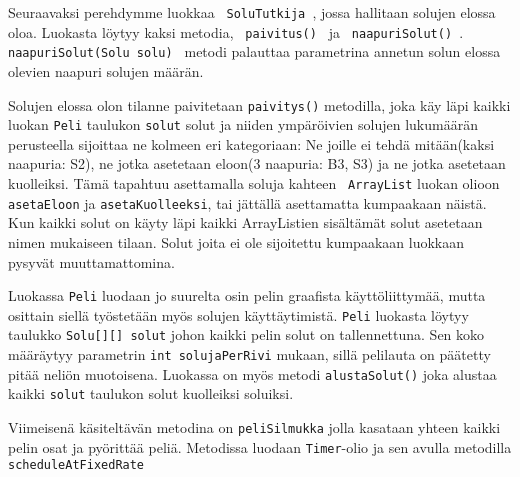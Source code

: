 Seuraavaksi perehdymme luokkaa \texttt{ SoluTutkija }, jossa hallitaan solujen elossa oloa. Luokasta löytyy kaksi metodia, \texttt{ paivitus() } ja \texttt{ naapuriSolut() }. \texttt{ naapuriSolut(Solu solu) } metodi palauttaa parametrina annetun solun elossa olevien naapuri solujen määrän. 

Solujen elossa olon tilanne paivitetaan \texttt{paivitys()} metodilla, joka käy läpi kaikki luokan \texttt{Peli} taulukon \texttt{solut} solut ja niiden ympäröivien solujen lukumäärän perusteella sijoittaa ne kolmeen eri kategoriaan: Ne joille ei tehdä mitään(kaksi naapuria: S2), ne jotka asetetaan eloon(3 naapuria: B3, S3) ja ne jotka asetetaan kuolleiksi. Tämä tapahtuu asettamalla soluja kahteen \texttt{ ArrayList} luokan olioon \texttt{asetaEloon} ja \texttt{asetaKuolleeksi}, tai jättällä asettamatta kumpaakaan näistä. Kun kaikki solut on käyty läpi kaikki ArrayListien sisältämät solut asetetaan nimen mukaiseen tilaan. Solut joita ei ole sijoitettu kumpaakaan luokkaan pysyvät muuttamattomina.

Luokassa \texttt{Peli} luodaan jo suurelta osin pelin graafista käyttöliittymää, mutta osittain siellä työstetään myös solujen käyttäytimistä. \texttt{Peli} luokasta löytyy taulukko \texttt{Solu[][] solut} johon kaikki pelin solut on tallennettuna. Sen koko määräytyy parametrin \texttt{int solujaPerRivi} mukaan, sillä pelilauta on päätetty pitää neliön muotoisena. Luokassa on myös metodi \texttt{alustaSolut()} joka alustaa kaikki \texttt{solut} taulukon solut kuolleiksi soluiksi. 

Viimeisenä käsiteltävän metodina on \texttt{peliSilmukka} jolla kasataan yhteen kaikki pelin osat ja pyörittää peliä. Metodissa luodaan \texttt{Timer}-olio ja sen avulla metodilla \texttt{scheduleAtFixedRate}
